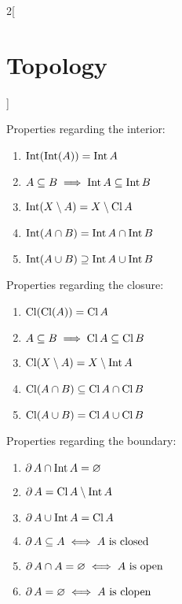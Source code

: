 \documentclass[../../../main.tex]{subfiles}
\begin{document}
\begin{multicols}{2}[\section{Topology}]
\begin{prop}
    Properties regarding the interior:
    \begin{enumerate}[leftmargin=1.15cm]\renewcommand{\labelenumi}{1.\arabic{enumi}.}
      \item $\operatorname{Int}(\operatorname{Int} (A))=         \operatorname{Int} A$
      \item $A\subseteq B\implies    \operatorname{Int} A\subseteq\operatorname{Int} B$
      \item $\operatorname{Int}(X\setminus A)=     X\setminus \operatorname{Cl} A$
      \item $\operatorname{Int}(A\cap B)=          \operatorname{Int} A\cap\operatorname{Int} B$
      \item $\operatorname{Int}(A\cup B)\supseteq  \operatorname{Int} A\cup\operatorname{Int} B$
    \end{enumerate}
    Properties regarding the closure:
    \begin{enumerate}[leftmargin=1.15cm]\renewcommand{\labelenumi}{2.\arabic{enumi}.}
      \item $\operatorname{Cl}(\operatorname{Cl} (A))=          \operatorname{Cl} A$
      \item $A\subseteq B\implies   \operatorname{Cl} A\subseteq\operatorname{Cl} B$
      \item $\operatorname{Cl}(X\setminus A)=     X\setminus \operatorname{Int} A$
      \item $\operatorname{Cl}(A\cap B)\subseteq  \operatorname{Cl} A\cap\operatorname{Cl} B$
      \item $\operatorname{Cl}(A\cup B)=          \operatorname{Cl} A\cup\operatorname{Cl} B$
    \end{enumerate}
    Properties regarding the boundary:
    \begin{enumerate}[leftmargin=1.15cm]\renewcommand{\labelenumi}{3.\arabic{enumi}.}
      \item $\operatorname{\partial} A\cap\operatorname{Int} A=         \varnothing$
      \item $\operatorname{\partial} A=\operatorname{Cl} A\setminus\operatorname{Int} A$
      \item $\operatorname{\partial} A\cup\operatorname{Int} A=             \operatorname{Cl} A$
      \item $\operatorname{\partial} A\subseteq A\iff  A  \text{ is closed}$
      \item $\operatorname{\partial} A\cap A=\varnothing\iff  A\text{ is open}$
      \item $\operatorname{\partial} A=\varnothing\iff\text{$A$ is clopen}$
    \end{enumerate}
  \end{prop}

\end{multicols}
\end{document}
